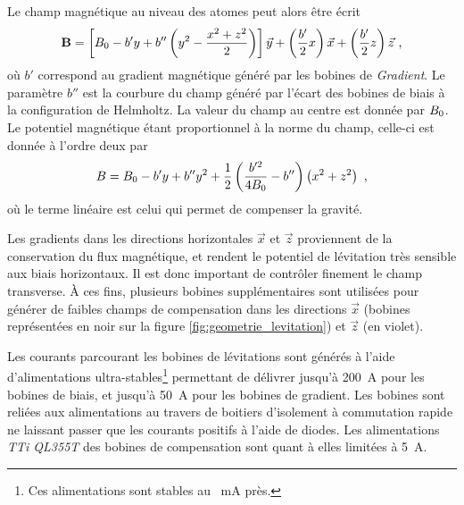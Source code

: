 Le champ magnétique au niveau des atomes peut alors être écrit
\begin{equation}
\mathbf{B}=\left[ B_0 - b'y + b'' \left( y^2 - \frac{x^2+z^2}{2} \right) \right] \vec{y} + \left( \frac{b'}{2}x \right) \vec{x} + \left( \frac{b'}{2}z \right) \vec{z} \text{ ,}
\label{eq:champ_mag_levitation}
\end{equation}
où $b'$ correspond au gradient magnétique généré par les bobines de \emph{Gradient}. Le  paramètre $b''$ est la courbure du champ généré par l'écart des bobines de biais à la configuration de Helmholtz. La valeur du champ au centre est donnée par $B_0$.
Le potentiel magnétique étant proportionnel à la norme du champ, celle-ci est donnée à l'ordre deux par
\begin{equation}
B=B_0 -b' y + b'' y^2 +\frac{1}{2} \left( \frac{b'^2}{4 B_0} - b'' \right) \left( x^2 + z^2 \right) \text{ ,}
\label{eq:norme_levitation}
\end{equation}
où le terme linéaire est celui qui permet de compenser la gravité.

Les gradients dans les directions horizontales $\vec{x}$ et $\vec{z}$ proviennent de la conservation du flux magnétique, et rendent le potentiel de lévitation très sensible aux biais horizontaux. Il est donc important de contrôler finement le champ transverse. À ces fins, plusieurs bobines supplémentaires sont utilisées pour générer de faibles champs de compensation dans les directions $\vec{x}$ (bobines représentées en noir sur la figure \ref{fig:geometrie_levitation}) et $\vec{z}$ (en violet).



 

Les courants parcourant les bobines de lévitations sont générés à l'aide d'alimentations ultra-stables\footnote{Ces alimentations sont stables au \SI{}{\milli\ampere} près.} permettant de délivrer jusqu'à \SI{200}{\ampere} pour les bobines de biais, et jusqu'à \SI{50}{\ampere} pour les bobines de gradient. Les bobines sont reliées aux alimentations au travers de boitiers d'isolement à commutation rapide ne laissant passer que les courants positifs à l'aide de diodes. Les alimentations \emph{TTi QL355T} des bobines de compensation sont quant à elles limitées à \SI{5}{\ampere}.

